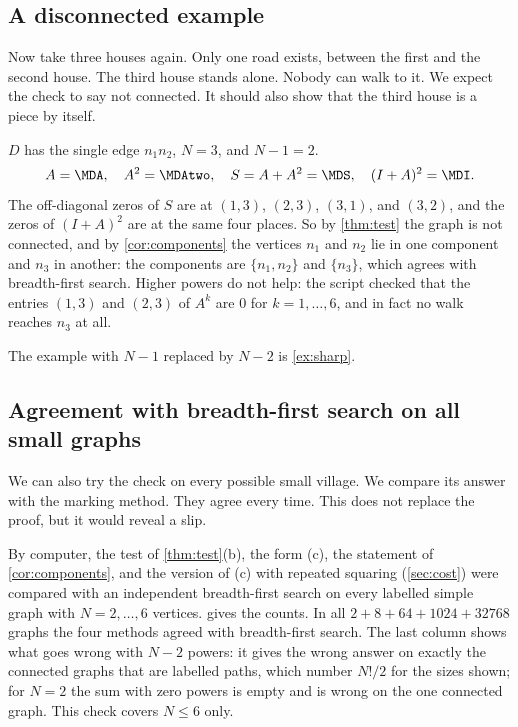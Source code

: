 \subsection{A disconnected example}\label{sec:testD}

\plainwords Now take three houses again.
Only one road exists, between the first and the second house.
The third house stands alone.
Nobody can walk to it.
We expect the check to say not connected.
It should also show that the third house is a piece by itself.

\begin{example}\label{ex:testD}
$D$ has the single edge $n_1n_2$, $N=3$, and $N-1=2$.
\[
A=\MDA,\quad A^2=\MDAtwo,\quad S=A+A^2=\MDS,\quad (I+A)^2=\MDI .
\]
The off-diagonal zeros of $S$ are at $(1,3)$, $(2,3)$, $(3,1)$, and $(3,2)$, and the zeros of $(I+A)^2$ are at the same four places.
So by \cref{thm:test} the graph is not connected, and by \cref{cor:components} the vertices $n_1$ and $n_2$ lie in one component and $n_3$ in another: the components are $\{n_1,n_2\}$ and $\{n_3\}$, which agrees with breadth-first search.
Higher powers do not help: the script checked that the entries $(1,3)$ and $(2,3)$ of $A^k$ are $0$ for $k=1,\dots,6$, and in fact no walk reaches $n_3$ at all.
\end{example}

The example with $N-1$ replaced by $N-2$ is \cref{ex:sharp}.

\subsection{Agreement with breadth-first search on all small graphs}\label{sec:exhaustive}

\plainwords We can also try the check on every possible small village.
We compare its answer with the marking method.
They agree every time.
This does not replace the proof, but it would reveal a slip.

By computer, the test of \cref{thm:test}(b), the form (c), the statement of \cref{cor:components}, and the version of (c) with repeated squaring (\cref{sec:cost}) were compared with an independent breadth-first search on every labelled simple graph with $N=2,\dots,6$ vertices.
 gives the counts.
In all $2+8+64+1024+32768$ graphs the four methods agreed with breadth-first search.
The last column shows what goes wrong with $N-2$ powers: it gives the wrong answer on exactly the connected graphs that are labelled paths, which number $N!/2$ for the sizes shown; for $N=2$ the sum with zero powers is empty and is wrong on the one connected graph.
This check covers $N\le 6$ only.

